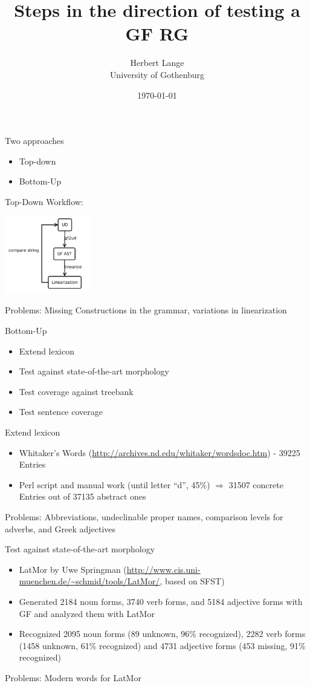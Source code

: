 \documentclass{beamer}
\title[The Latin Language Ressource Grammar]{Steps in the direction of testing a GF RG}
\author{Herbert Lange\\University of Gothenburg}
\date{\today}
\begin{document}
\frame{\titlepage}

\begin{frame}
  Two approaches
  \begin{itemize}
    \item Top-down
    \item  Bottom-Up
  \end{itemize}
\end{frame}
\begin{frame}{Top-Down}
  Workflow:
  
  \includegraphics[width=10em]{ud.pdf}

  Problems: Missing Constructions in the grammar, variations in linearization
\end{frame}
\begin{frame}{Bottom-Up}
  \begin{itemize}
  \item Extend lexicon
  \item Test against state-of-the-art morphology
  \item Test coverage against treebank
  \item Test sentence coverage
  \end{itemize}
\end{frame}
\begin{frame}{Extend lexicon}
    \begin{itemize}
    \item Whitaker's Words (\url{http://archives.nd.edu/whitaker/wordsdoc.htm}) - 39225 Entries
    \item Perl script and manual work (until letter ``d'', 45\%) $\Rightarrow$  31507 concrete Entries out of 37135 abstract ones
    \end{itemize}
    Problems: Abbreviations, undeclinable proper names, comparison levels for adverbs, and Greek adjectives
\end{frame}
\begin{frame}{Test against state-of-the-art morphology}
    \begin{itemize}
    \item LatMor by Uwe Springman (\url{http://www.cis.uni-muenchen.de/~schmid/tools/LatMor/}, based on SFST)
    \item Generated 2184 noun forms, 3740 verb forms, and 5184 adjective forms with GF and analyzed them with LatMor
    \item Recognized 2095 noun forms (89 unknown, 96\% recognized), 2282 verb forms (1458 unknown, 61\% recognized) and 4731 adjective forms (453 missing, 91\% recognized)
    \end{itemize}
    Problems: Modern words for LatMor
\end{frame}
\end{document}

